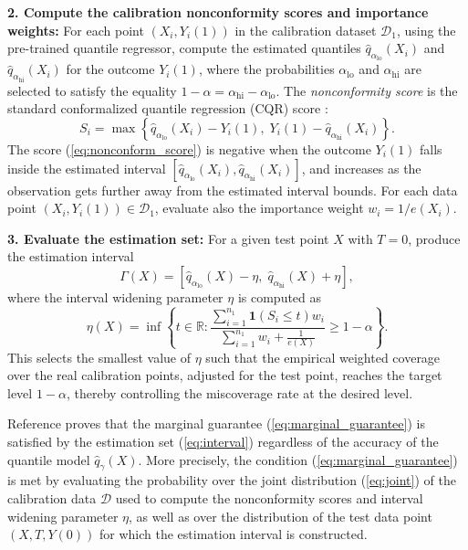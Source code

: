 \documentclass{article}
\theoremstyle{plain}
\theoremstyle{definition}
\theoremstyle{remark}
\begin{document}
\textbf{2. Compute the calibration nonconformity scores and importance weights:} For each point \( (X_i,  Y_i(1))\) in the calibration dataset $\mathcal{D}_1$, using the pre-trained quantile regressor, compute the estimated quantiles $\hat{q}_{\alpha_\text{lo}}(X_i)$ and $\hat{q}_{\alpha_\text{hi}}(X_i)$ for the outcome $Y_i(1)$, where the probabilities $\alpha_\text{lo}$ and $\alpha_\text{hi}$ are selected to satisfy the equality $1-\alpha = \alpha_\text{hi} - \alpha_\text{lo}$. The \emph{nonconformity score} is the standard conformalized quantile regression (CQR) score \citep{romano2019conformalized}:
    \begin{equation}
    \label{eq:nonconform_score}
        S_i = \max\left\{ \hat{q}_{\alpha_{\text{lo}}}(X_i) - Y_i(1),\; Y_i(1)- \hat{q}_{\alpha_{\text{hi}}}(X_i) \right\}.
    \end{equation}
    The score (\ref{eq:nonconform_score}) is negative when the outcome $Y_i(1)$ falls inside the estimated interval $[\hat{q}_{\alpha_\text{lo}}(X_i), \hat{q}_{\alpha_\text{hi}}(X_i)]$, and increases as the observation gets further away from the estimated interval bounds. For each data point \( (X_i, Y_i(1)) \in \mathcal{D}_1 \), evaluate also the importance weight $w_i = 1/e(X_i)$.

    \textbf{3. Evaluate the estimation set:} For a given test point \( X \) with $T = 0$, produce the estimation interval
    \begin{equation}
    \label{eq:interval}
        \Gamma(X) = \left[ \hat{q}_{\alpha_{\text{lo}}}(X) - \eta,\; \hat{q}_{\alpha_{\text{hi}}}(X) + \eta \right],
    \end{equation}
    where the interval widening parameter \( \eta \) is computed as
    \begin{equation}
    \label{eq:quantile_weights}
\eta(X) = \inf \left\{ t \in \mathbb{R} : \frac{\sum_{i=1}^{n_1}\mathbf{1}(S_i\leq t) w_i}{\sum_{i=1}^{n_1} w_i + \frac{1}{e(X)}} \geq 1 - \alpha \right\}.
    \end{equation}
    This selects the smallest value of $\eta$ such that the empirical weighted coverage over the real calibration points, adjusted for the test point, reaches the target level $1-\alpha$, thereby controlling the miscoverage rate at the desired level.



Reference \citep{lei2021conformal} proves that the marginal guarantee (\ref{eq:marginal_guarantee}) is satisfied by the estimation set (\ref{eq:interval}) regardless of the accuracy of the quantile model $\hat{q}_\gamma(X)$. More precisely, the condition (\ref{eq:marginal_guarantee}) is met by evaluating the probability over the joint distribution (\ref{eq:joint}) of the calibration data $\mathcal{D}$ used to compute the nonconformity scores and interval widening parameter $\eta$, as well as over the distribution of the test data point $(X, T, Y(0))$ for which the estimation interval is constructed.
\end{document}
